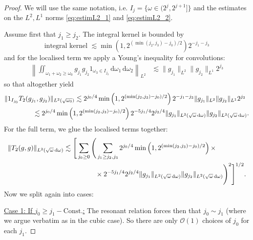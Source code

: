 \documentclass[10pt,a4paper]{amsart}
\newcommand{\dd}{{\, \mathrm d}}
\begin{document}
\begin{proof}
We will use the same notation, i.e. $I_j=\{\omega \in (2^j, 2^{j+1}]\}$ and the estimates on the $L^2, L^1$ norms \eqref{eq:estimL2_1} and \eqref{eq:estimL2_2}.

Assume first that $j_1\geq j_2$. The integral kernel is bounded by 
$$\text{integral kernel } \lesssim \min\left(1, 2^{(\min(j_2,j_3) - j_0)/2} \right) 2^{-j_1-j_3}$$ and for the localised term we apply a Young's inequality for convolutions: 
 \begin{align*}
     \left\| 
     \iint_{\omega_1+\omega_2\geq \omega_0}
     g_{j_1}g_{j_2} 1_{\omega_3 \in I_{j_3}} \dd \omega_1\dd\omega_2
     \right\|_{L^2} 
     &\lesssim \|g_{j_1}\|_{L^2} \|g_{j_2}\|_{L^1} 2^{j_3}
     \end{align*}
     so that altogether yield 
     \begin{align*}
         &\|1_{I_{j_0}} T_2(g_{j_1},g_{j_2})\|_{L^2(\sqrt{\omega_0})}  \lesssim 2^{j_0/4} \min\left(1, 2^{(\min(j_2,j_3) - j_0)/2} \right) 2^{-j_1-j_3}\|g_{j_1}\|_{L^2} \|g_{j_2}\|_{L^1} 2^{j_3}\\
         &\hskip 1.5cm \lesssim 
         2^{j_0/4} \min\left(1, 2^{(\min(j_2,j_3) - j_0)/2} \right) 2^{-5j_1/4}2^{j_2/4}\|g_{j_1}\|_{L^2(\sqrt{\omega}\dd\omega)} \|g_{j_2}\|_{L^2(\sqrt{\omega}\dd\omega)}. 
     \end{align*}
     For the full term, we glue the localised terms together: 
\begin{align*}
&\|T_2(g,g) \|_{L^2(\sqrt{\omega}\dd\omega)}\lesssim 
\Bigg[\sum_{j_0\geq 0} \Bigg( \sum_{j_1\geq j_2,j_3} 2^{j_0/4}\min\left(1, 2^{(\min(j_2,j_3) - j_0)/2} \right)\times  \\
& \hskip 4.5cm \times 2^{-5j_1/4}2^{j_2/4}\|g_{j_1}\|_{L^2(\sqrt{\omega}\dd\omega)} \|g_{j_2}\|_{L^2(\sqrt{\omega}\dd\omega)}  \Bigg)^2 \Bigg]^{1/2}.
\end{align*} 
 Now we split again into cases: 

      \noindent
        \underline{Case 1: If $j_0 \geq j_1 - \text{Const.}$:} The resonant relation forces then that $j_0 \sim j_1$ (where we argue verbatim as in the cubic case). So there are only $\mathcal{O}(1)$ choices of $j_0$ for each $j_1$. 


\end{proof}
\end{document}
